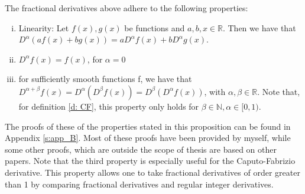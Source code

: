 \begin{proposition}\label{p: calculus}
    The fractional derivatives above adhere to the following properties:
    \begin{enumerate}[(i)]
        \item Linearity: Let \(f(x), g(x)\) be functions and \(a, b, x \in \mathbb{R}\). Then we have that \(D^{\alpha} (a f(x) + b g(x)) = a D^{\alpha} f(x) + b D^{\alpha} g(x)\).
        \item \(D^{\alpha} f(x) = f(x)\), for \(\alpha = 0\) 
        \item for sufficiently smooth functions f, we have that \(D^{\alpha + \beta} f(x) = D^\alpha(D^\beta f(x)) =  D^\beta(D^\alpha f(x))\), with \(\alpha, \beta \in \mathbb{R}\). Note that, for definition \ref{d: CF}, this property only holds for \(\beta \in \mathbb{N}, \alpha \in [0,1)\).
    \end{enumerate}
        
    
\end{proposition}

The proofs of these of the properties stated in this proposition can be found in Appendix \ref{s:app_B}. Most of these proofs have been provided by myself, while some other proofs, which are outside the scope of thesis are based on other papers. Note that the third property is especially useful for the Caputo-Fabrizio derivative. This property allows one to take fractional derivatives of order greater than 1 by comparing fractional derivatives and regular integer derivatives.

